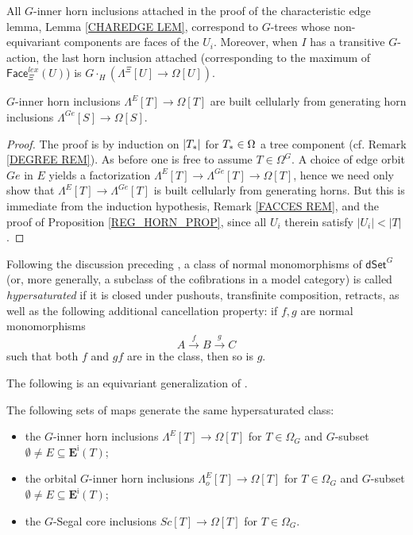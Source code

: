 \documentclass[a4paper,10pt
,draft
]{article}%
\begin{document}
\begin{remark}\label{FACCES REM}
All $G$-inner horn inclusions attached in the proof of the characteristic edge lemma, Lemma \ref{CHAREDGE LEM}, correspond to $G$-trees whose non-equivariant components are faces of the $U_i$. Moreover, when $I$ has a transitive $G$-action, the last horn inclusion attached (corresponding to the maximum of $\mathsf{Face}^{lex}_{\Xi}(U)$) is
$G \cdot_H \left( \Lambda^{\Xi}[U] \to \Omega[U] \right)$.
\end{remark}


\begin{corollary}\label{REGGENHORN COR}
$G$-inner horn inclusions
$\Lambda^{E}[T] \to \Omega[T]$
are built cellularly from generating horn inclusions
$\Lambda^{Ge}[S] \to \Omega[S]$.
\end{corollary}

\begin{proof}
	The proof is by induction on $|T_{\**}|$ for $T_{\**}\in \Omega$ a tree component (cf. Remark \ref{DEGREE REM}). As before one is free to assume $T \in \Omega^G$.	
	A choice of edge orbit $Ge$ in $E$ yields a factorization
	$\Lambda^{E}[T] \to \Lambda^{Ge}[T] \to \Omega[T]$,
	hence we need only show that 
	$\Lambda^{E}[T] \to \Lambda^{Ge}[T]$ is built cellularly from generating horns. 
	But this is immediate from the induction hypothesis,
	Remark \ref{FACCES REM}, and the proof of Proposition \ref{REG_HORN_PROP}, since all
	$U_{i}$ therein satisfy $|U_i|<|T|$.
\end{proof}


Following the discussion preceding \cite[Prop. 3.6.8]{HHM16},
a class of normal monomorphisms of $\mathsf{dSet}^G$
(or, more generally, a subclass of the cofibrations in a model category) is called
\textit{hypersaturated} if it is closed under
pushouts, transfinite composition, retracts,
as well as the following additional cancellation property: 
if $f,g$ are normal monomorphisms
\begin{equation}\label{CANCEL_EQ}
A \xrightarrow{f} B \xrightarrow{g} C
\end{equation}
such that both $f$ and $gf$ are in the class, then so is $g$.

The following is an equivariant generalization of 
\cite[Props. 2.4 and 2.5]{CM13a}.


\begin{proposition}\label{HYPER PROP}
The following sets of maps generate the same hypersaturated class:
\begin{itemize}
\item the $G$-inner horn inclusions
$\Lambda^{E} [T] \to \Omega[T]$ for $T \in \Omega_G$ and 
$G$-subset $\emptyset \neq E \subseteq \boldsymbol{E}^{\mathsf{i}}(T)$; 
\item the orbital $G$-inner horn inclusions
$\Lambda^{E}_o [T] \to \Omega[T]$ for $T \in \Omega_G$ and 
$G$-subset $\emptyset \neq E \subseteq \boldsymbol{E}^{\mathsf{i}}(T)$; 
\item the $G$-Segal core inclusions
$Sc[T] \to \Omega[T]$ for $T \in \Omega_G$.
\end{itemize}
\end{proposition}
\end{document}
